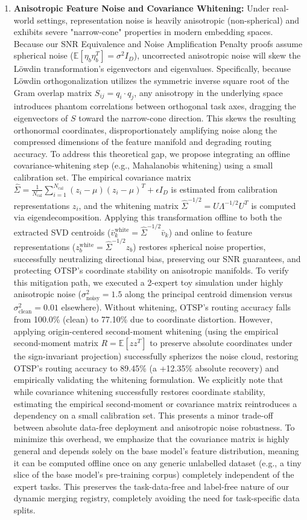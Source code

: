 \begin{enumerate}
    \item \textbf{Anisotropic Feature Noise and Covariance Whitening:} Under real-world settings, representation noise is heavily anisotropic (non-spherical) and exhibits severe "narrow-cone" properties in modern embedding spaces. Because our SNR Equivalence and Noise Amplification Penalty proofs assume spherical noise ($\mathbb{E}[\eta_b \eta_b^T] = \sigma^2 I_D$), uncorrected anisotropic noise will skew the L{\"o}wdin transformation's eigenvectors and eigenvalues. Specifically, because L{\"o}wdin orthogonalization utilizes the symmetric inverse square root of the Gram overlap matrix $S_{ij} = q_i \cdot q_j$, any anisotropy in the underlying space introduces phantom correlations between orthogonal task axes, dragging the eigenvectors of $S$ toward the narrow-cone direction. This skews the resulting orthonormal coordinates, disproportionately amplifying noise along the compressed dimensions of the feature manifold and degrading routing accuracy. To address this theoretical gap, we propose integrating an offline covariance-whitening step (e.g., Mahalanobis whitening) using a small calibration set. The empirical covariance matrix $\hat{\Sigma} = \frac{1}{N_{\text{cal}}} \sum_{i=1}^{N_{\text{cal}}} (z_i - \mu)(z_i - \mu)^T + \epsilon I_D$ is estimated from calibration representations $z_i$, and the whitening matrix $\hat{\Sigma}^{-1/2} = U \Lambda^{-1/2} U^T$ is computed via eigendecomposition. Applying this transformation offline to both the extracted SVD centroids ($\bar{v}_k^{\text{white}} = \hat{\Sigma}^{-1/2} \bar{v}_k$) and online to feature representations ($z_b^{\text{white}} = \hat{\Sigma}^{-1/2} z_b$) restores spherical noise properties, successfully neutralizing directional bias, preserving our SNR guarantees, and protecting OTSP's coordinate stability on anisotropic manifolds. To verify this mitigation path, we executed a 2-expert toy simulation under highly anisotropic noise ($\sigma^2_{\text{noisy}} = 1.5$ along the principal centroid dimension versus $\sigma^2_{\text{clean}} = 0.01$ elsewhere). Without whitening, OTSP's routing accuracy falls from 100.0\% (clean) to 77.10\% due to coordinate distortion. However, applying origin-centered second-moment whitening (using the empirical second-moment matrix $R = \mathbb{E}[z z^T]$ to preserve absolute coordinates under the sign-invariant projection) successfully spherizes the noise cloud, restoring OTSP's routing accuracy to 89.45\% (a +12.35\% absolute recovery) and empirically validating the whitening formulation. We explicitly note that while covariance whitening successfully restores coordinate stability, estimating the empirical second-moment or covariance matrix reintroduces a dependency on a small calibration set. This presents a minor trade-off between absolute data-free deployment and anisotropic noise robustness. To minimize this overhead, we emphasize that the covariance matrix is highly general and depends solely on the base model's feature distribution, meaning it can be computed offline once on any generic unlabelled dataset (e.g., a tiny slice of the base model's pre-training corpus) completely independent of the expert tasks. This preserves the task-data-free and label-free nature of our dynamic merging registry, completely avoiding the need for task-specific data splits.

\end{enumerate}
